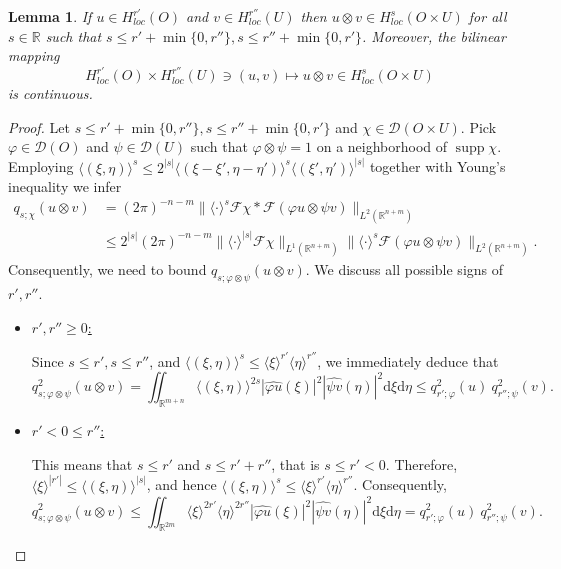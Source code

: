 \documentclass{amsart}
\newcommand{\supp}{\operatorname{supp}}
\newtheorem{lemma}[theorem]{Lemma}
\theoremstyle{definition}
\begin{document}
\begin{lemma}
\label{LemaHlocs}
If $u\in H_{loc} ^{r'} (O) $ and $v\in H_{loc} ^{r''} (U) $ then $u\otimes v \in H_{loc} ^{s} (O \times U)$ for all $s\in \mathbb{R}$ such that $s \leq r' + \min \{0,r'' \},  s \leq r'' + \min \{0,r' \}$. Moreover, the bilinear mapping
$$H_{loc} ^{r'} (O) \times H_{loc} ^{r''} (U) \ni (u,v) \mapsto u\otimes v \in H_{loc} ^{s} (O\times U)$$
is continuous.
\end{lemma}
\begin{proof}
Let $s \leq r' + \min \{0,r'' \},  s \leq r'' + \min \{0,r' \}$ and $\chi\in\mathcal{D}(O\times U)$. Pick $\varphi \in \mathcal{D} (O)$ and $\psi\in \mathcal{D} (U)$ such that $\varphi\otimes \psi=1$ on a neighborhood of $\supp\chi$. Employing $\langle(\xi,\eta)\rangle^s\leq 2^{|s|}\langle (\xi-\xi',\eta-\eta')\rangle^s\langle(\xi',\eta')\rangle^{|s|}$ together with Young's inequality we infer
\begin{align}
q_{s;\chi}(u\otimes v)&=(2\pi)^{-n-m}\|\langle\cdot\rangle^s\mathcal{F}\chi*\mathcal{F}(\varphi u\otimes \psi v)\|_{L^2(\mathbb{R}^{n+m})}\nonumber\\
&\leq 2^{|s|}(2\pi)^{-n-m}\|\langle\cdot\rangle^{|s|}\mathcal{F}\chi\|_{L^1(\mathbb{R}^{n+m})}\|\langle\cdot\rangle^s\mathcal{F}(\varphi u\otimes \psi v)\|_{L^2(\mathbb{R}^{n+m})}.\label{bound-forone-t}
\end{align}
Consequently, we need to bound $q_{s; \varphi \otimes \psi} (u\otimes v)$. We discuss all possible signs of $r',r''$.
\begin{itemize}
\item \underline{$r',r''\geq 0$:}

Since $s \leq r' ,  s \leq r'' $, and $\langle (\xi , \eta) \rangle^s \leq \langle \xi \rangle^{r'} \langle \eta \rangle^{r''}$, we immediately deduce that
\begin{equation}\label{1_nejedn}
q_{s; \varphi \otimes \psi} ^2 (u\otimes v) 
= \iint_{\mathbb{R}^{m+n}} \langle (\xi , \eta) \rangle^{2s} | \widehat{\varphi u} (\xi) |^2 |\widehat{\psi v} (\eta)|^2 \mathrm{d}\xi \mathrm{d}\eta\leq q_{r'; \varphi } ^2 (u)  \ q_{r''; \psi} ^2 (v). 
\end{equation}

\item \underline{$r'<0 \leq r''$:}

This means that $s\leq r'$ and $s\leq r'+r''$, that is $s\leq r'<0$. Therefore, $\langle \xi \rangle^{|r'|} \leq \langle (\xi,\eta) \rangle^{|s|}$, and hence $\langle (\xi , \eta) \rangle^{s}\leq \langle \xi \rangle^{r'} \langle \eta \rangle^{r''}$. Consequently,
\begin{equation}\label{2_nejedn}
q_{s; \varphi \otimes \psi} ^2 (u\otimes v) 
\leq \iint_{\mathbb{R}^{2m}} \langle \xi \rangle^{2r'} \langle \eta \rangle^{2r''} | \widehat{\varphi u} (\xi) |^2 |\widehat{\psi v} (\eta)|^2 \mathrm{d}\xi \mathrm{d}\eta = q_{r'; \varphi } ^2 (u) \ q_{r''; \psi} ^2 (v).
\end{equation}


\end{itemize}
\end{proof}
\end{document}
